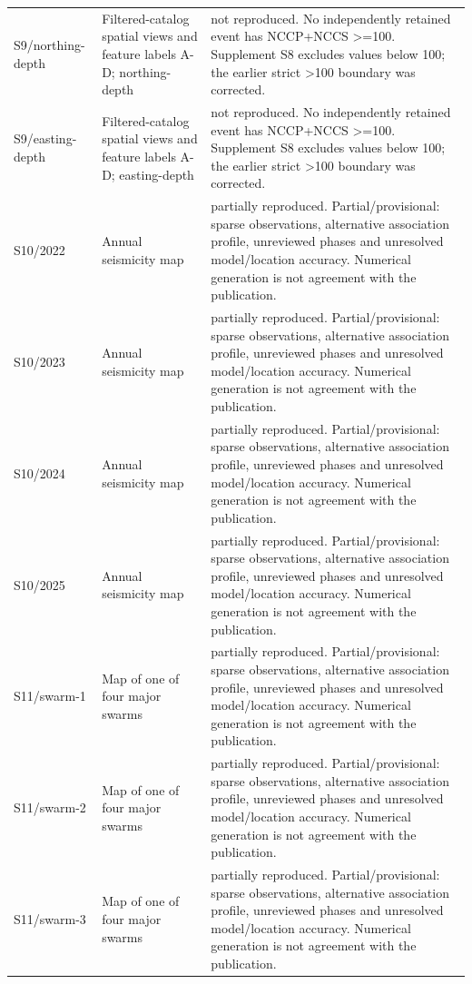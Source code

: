 \begin{longtable}{>{\raggedright\arraybackslash}p{.13\linewidth}>{\raggedright\arraybackslash}p{.28\linewidth}>{\raggedright\arraybackslash}p{.49\linewidth}}
S9/\allowbreak{}northing-depth & Filtered-catalog spatial views and feature labels A-D; northing-depth & not reproduced. No independently retained event has NCCP+NCCS >=100. Supplement S8 excludes values below 100; the earlier strict >100 boundary was corrected.\\[3pt]
S9/\allowbreak{}easting-depth & Filtered-catalog spatial views and feature labels A-D; easting-depth & not reproduced. No independently retained event has NCCP+NCCS >=100. Supplement S8 excludes values below 100; the earlier strict >100 boundary was corrected.\\[3pt]
S10/\allowbreak{}2022 & Annual seismicity map & partially reproduced. Partial/provisional: sparse observations, alternative association profile, unreviewed phases and unresolved model/location accuracy. Numerical generation is not agreement with the publication.\\[3pt]
S10/\allowbreak{}2023 & Annual seismicity map & partially reproduced. Partial/provisional: sparse observations, alternative association profile, unreviewed phases and unresolved model/location accuracy. Numerical generation is not agreement with the publication.\\[3pt]
S10/\allowbreak{}2024 & Annual seismicity map & partially reproduced. Partial/provisional: sparse observations, alternative association profile, unreviewed phases and unresolved model/location accuracy. Numerical generation is not agreement with the publication.\\[3pt]
S10/\allowbreak{}2025 & Annual seismicity map & partially reproduced. Partial/provisional: sparse observations, alternative association profile, unreviewed phases and unresolved model/location accuracy. Numerical generation is not agreement with the publication.\\[3pt]
S11/\allowbreak{}swarm-1 & Map of one of four major swarms & partially reproduced. Partial/provisional: sparse observations, alternative association profile, unreviewed phases and unresolved model/location accuracy. Numerical generation is not agreement with the publication.\\[3pt]
S11/\allowbreak{}swarm-2 & Map of one of four major swarms & partially reproduced. Partial/provisional: sparse observations, alternative association profile, unreviewed phases and unresolved model/location accuracy. Numerical generation is not agreement with the publication.\\[3pt]
S11/\allowbreak{}swarm-3 & Map of one of four major swarms & partially reproduced. Partial/provisional: sparse observations, alternative association profile, unreviewed phases and unresolved model/location accuracy. Numerical generation is not agreement with the publication.\\[3pt]

\end{longtable}
